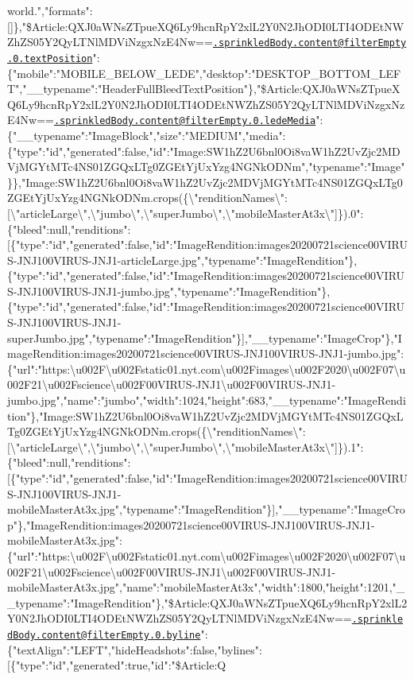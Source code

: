 world.","formats":{[}{]}\},"\$Article:QXJ0aWNsZTpueXQ6Ly9hcnRpY2xlL2Y0N2JhODI0LTI4ODEtNWZhZS05Y2QyLTNlMDViNzgxNzE4Nw==\href{mailto:.sprinkledBody.content@filterEmpty.0.textPosition}{\nolinkurl{.sprinkledBody.content@filterEmpty.0.textPosition}}":\{"mobile":"MOBILE\_BELOW\_LEDE","desktop":"DESKTOP\_BOTTOM\_LEFT","\_\_typename":"HeaderFullBleedTextPosition"\},"\$Article:QXJ0aWNsZTpueXQ6Ly9hcnRpY2xlL2Y0N2JhODI0LTI4ODEtNWZhZS05Y2QyLTNlMDViNzgxNzE4Nw==\href{mailto:.sprinkledBody.content@filterEmpty.0.ledeMedia}{\nolinkurl{.sprinkledBody.content@filterEmpty.0.ledeMedia}}":\{"\_\_typename":"ImageBlock","size":"MEDIUM","media":\{"type":"id","generated":false,"id":"Image:SW1hZ2U6bnl0Oi8vaW1hZ2UvZjc2MDVjMGYtMTc4NS01ZGQxLTg0ZGEtYjUxYzg4NGNkODNm","typename":"Image"\}\},"Image:SW1hZ2U6bnl0Oi8vaW1hZ2UvZjc2MDVjMGYtMTc4NS01ZGQxLTg0ZGEtYjUxYzg4NGNkODNm.crops(\{\textbackslash{}"renditionNames\textbackslash{}":{[}\textbackslash{}"articleLarge\textbackslash{}",\textbackslash{}"jumbo\textbackslash{}",\textbackslash{}"superJumbo\textbackslash{}",\textbackslash{}"mobileMasterAt3x\textbackslash{}"{]}\}).0":\{"bleed":null,"renditions":{[}\{"type":"id","generated":false,"id":"ImageRendition:images20200721science00VIRUS-JNJ100VIRUS-JNJ1-articleLarge.jpg","typename":"ImageRendition"\},\{"type":"id","generated":false,"id":"ImageRendition:images20200721science00VIRUS-JNJ100VIRUS-JNJ1-jumbo.jpg","typename":"ImageRendition"\},\{"type":"id","generated":false,"id":"ImageRendition:images20200721science00VIRUS-JNJ100VIRUS-JNJ1-superJumbo.jpg","typename":"ImageRendition"\}{]},"\_\_typename":"ImageCrop"\},"ImageRendition:images20200721science00VIRUS-JNJ100VIRUS-JNJ1-jumbo.jpg":\{"url":"https:\textbackslash{}u002F\textbackslash{}u002Fstatic01.nyt.com\textbackslash{}u002Fimages\textbackslash{}u002F2020\textbackslash{}u002F07\textbackslash{}u002F21\textbackslash{}u002Fscience\textbackslash{}u002F00VIRUS-JNJ1\textbackslash{}u002F00VIRUS-JNJ1-jumbo.jpg","name":"jumbo","width":1024,"height":683,"\_\_typename":"ImageRendition"\},"Image:SW1hZ2U6bnl0Oi8vaW1hZ2UvZjc2MDVjMGYtMTc4NS01ZGQxLTg0ZGEtYjUxYzg4NGNkODNm.crops(\{\textbackslash{}"renditionNames\textbackslash{}":{[}\textbackslash{}"articleLarge\textbackslash{}",\textbackslash{}"jumbo\textbackslash{}",\textbackslash{}"superJumbo\textbackslash{}",\textbackslash{}"mobileMasterAt3x\textbackslash{}"{]}\}).1":\{"bleed":null,"renditions":{[}\{"type":"id","generated":false,"id":"ImageRendition:images20200721science00VIRUS-JNJ100VIRUS-JNJ1-mobileMasterAt3x.jpg","typename":"ImageRendition"\}{]},"\_\_typename":"ImageCrop"\},"ImageRendition:images20200721science00VIRUS-JNJ100VIRUS-JNJ1-mobileMasterAt3x.jpg":\{"url":"https:\textbackslash{}u002F\textbackslash{}u002Fstatic01.nyt.com\textbackslash{}u002Fimages\textbackslash{}u002F2020\textbackslash{}u002F07\textbackslash{}u002F21\textbackslash{}u002Fscience\textbackslash{}u002F00VIRUS-JNJ1\textbackslash{}u002F00VIRUS-JNJ1-mobileMasterAt3x.jpg","name":"mobileMasterAt3x","width":1800,"height":1201,"\_\_typename":"ImageRendition"\},"\$Article:QXJ0aWNsZTpueXQ6Ly9hcnRpY2xlL2Y0N2JhODI0LTI4ODEtNWZhZS05Y2QyLTNlMDViNzgxNzE4Nw==\href{mailto:.sprinkledBody.content@filterEmpty.0.byline}{\nolinkurl{.sprinkledBody.content@filterEmpty.0.byline}}":\{"textAlign":"LEFT","hideHeadshots":false,"bylines":{[}\{"type":"id","generated":true,"id":"\$Article:Q